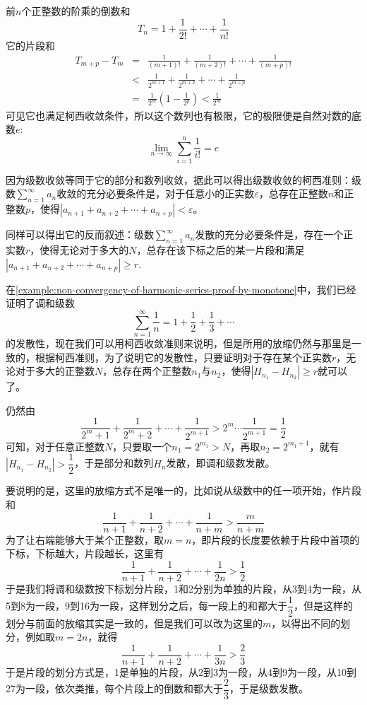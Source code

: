 \begin{example}
  前$n$个正整数的阶乘的倒数和
  \[ T_n = 1 + \frac{1}{2!} + \cdots + \frac{1}{n!} \]
  它的片段和
  \begin{eqnarray*}
    T_{m+p} - T_m & = & \frac{1}{(m+1)!} + \frac{1}{(m+2)!} + \cdots + \frac{1}{(m+p)!} \\
                  & < & \frac{1}{2^{m+1}} + \frac{1}{2^{m+2}} + \cdots + \frac{1}{2^{m+p}} \\
    & = & \frac{1}{2^m} \left( 1-\frac{1}{2^p} \right) < \frac{1}{2^m}
  \end{eqnarray*}
  可见它也满足柯西收敛条件，所以这个数列也有极限，它的极限便是自然对数的底数$e$:
  \[ \lim_{n \to \infty} \sum_{i=1}^n \frac{1}{i!} = e \]
\end{example}

\begin{example}[级数收敛的柯西准则]
  因为级数收敛等同于它的部分和数列收敛，据此可以得出级数收敛的柯西准则：级数$\sum_{n=1}^{\infty} a_n$收敛的充分必要条件是，对于任意小的正实数$\varepsilon$，总存在正整数$n$和正整数$p$，使得$|a_{n+1}+a_{n+2} + \cdots + a_{n+p}|<\varepsilon$。

  同样可以得出它的反而叙述：级数$\sum_{n=1}^{\infty} a_n$发散的充分必要条件是，存在一个正实数$r$，使得无论对于多大的$N$，总存在该下标之后的某一片段和满足$|a_{n+1}+a_{n+2}+\cdots+a_{n+p}| \geqslant r$.
\end{example}

\begin{example}[调和级数的发散性]
  \label{example:non-convergency-of-harmonic-series-proof-by-cauchy}
  在\autoref{example:non-convergency-of-harmonic-series-proof-by-monotone}中，我们已经证明了调和级数
  \[ \sum_{n=1}^{\infty} \frac{1}{n} = 1+\frac{1}{2} + \frac{1}{3} + \cdots  \]
  的发散性，现在我们可以用柯西收敛准则来说明，但是所用的放缩仍然与那里是一致的，根据柯西准则，为了说明它的发散性，只要证明对于存在某个正实数$r$，无论对于多大的正整数$N$，总存在两个正整数$n_1$与$n_2$，使得$|H_{n_1}-H_{n_2}|\geqslant r$就可以了。

  仍然由
  \[ \frac{1}{2^m+1} + \frac{1}{2^m+2} + \cdots + \frac{1}{2^{m+1}} > 2^m \cdots \frac{1}{2^{m+1}} = \frac{1}{2} \]
可知，对于任意正整数$N$，只要取一个$n_1=2^{m_1}>N$，再取$n_2=2^{m_1+1}$，就有$|H_{n_1}-H_{n_2}|>\dfrac{1}{2}$，于是部分和数列$H_n$发散，即调和级数发散。

要说明的是，这里的放缩方式不是唯一的，比如说从级数中的任一项开始，作片段和
\[ \frac{1}{n+1} + \frac{1}{n+2} + \cdots + \frac{1}{n+m} > \frac{m}{n+m} \]
为了让右端能够大于某个正整数，取$m=n$，即片段的长度要依赖于片段中首项的下标，下标越大，片段越长，这里有
\[ \frac{1}{n+1} + \frac{1}{n+2} + \cdots + \frac{1}{2n} > \frac{1}{2} \]
于是我们将调和级数按下标划分片段，1和2分别为单独的片段，从3到4为一段，从5到8为一段，9到16为一段，这样划分之后，每一段上的和都大于$\dfrac{1}{2}$，但是这样的划分与前面的放缩其实是一致的，但是我们可以改为这里的$m$，以得出不同的划分，例如取$m=2n$，就得
\[ \frac{1}{n+1} + \frac{1}{n+2} + \cdots + \frac{1}{3n} > \frac{2}{3} \]
于是片段的划分方式是，1是单独的片段，从2到3为一段，从4到9为一段，从10到27为一段，依次类推，每个片段上的倒数和都大于$\dfrac{2}{3}$，于是级数发散。
\end{example}


